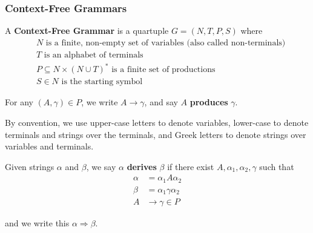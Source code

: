 \subsubsection{Context-Free Grammars}\label{subsec:context-free-grammars}
\begin{definition}
    A \textbf{Context-Free Grammar} is a quartuple \(G=(N, T, P, S)\) where 
          \begin{align*}
                & N\text{ is a finite, non-empty set of variables (also called non-terminals)}\\
                & T\text{ is an alphabet of terminals}\\
                & P\subseteq N\times{(N\cup T)}^*\text{ is a finite set of productions}\\
                & S\in N\text{ is the starting symbol}
          \end{align*}

          For any \((A, \gamma)\in P\), we write \(A\to\gamma \), and say \(A\) \textbf{produces} \(\gamma \). 
\end{definition}

By convention, we use upper-case letters to denote variables, lower-case to denote terminals and strings over the terminals, and Greek letters to denote strings over variables and terminals.

\begin{definition}
    Given strings \(\alpha \) and \(\beta \), we say \(\alpha \) \textbf{derives} \(\beta \) if there exist \(A, \alpha_1,\alpha_2,\gamma \) such that 
    \begin{align*}
          \alpha &= \alpha_1A\alpha_2\\
          \beta  &= \alpha_1\gamma\alpha_2\\
          A&\to \gamma\in P
    \end{align*}

    and we write this \(\alpha\Rightarrow\beta \). 
\end{definition}